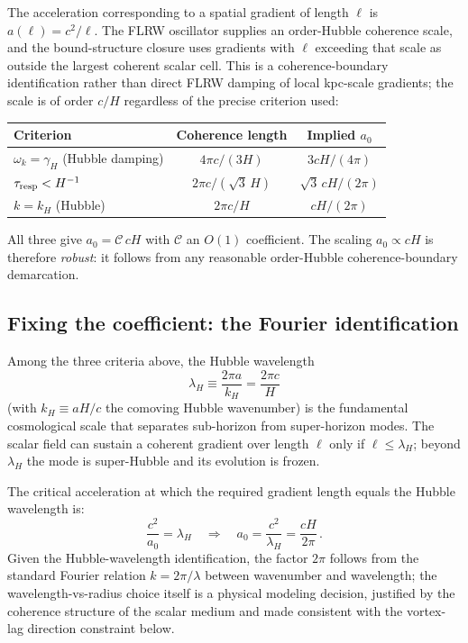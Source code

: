 \documentclass[11pt]{article}
\begin{document}
The acceleration corresponding to a spatial gradient of length $\ell$ is $a(\ell)=c^2/\ell$.  The FLRW oscillator supplies an order-Hubble coherence scale, and the bound-structure closure uses gradients with $\ell$ exceeding that scale as outside the largest coherent scalar cell.  This is a coherence-boundary identification rather than direct FLRW damping of local kpc-scale gradients; the scale is of order $c/H$ regardless of the precise criterion used:
\begin{center}
\begin{tabular}{@{}lcc@{}}
\toprule
Criterion & Coherence length & Implied $a_0$ \\
\midrule
$\omega_k=\gamma_H$ (Hubble damping) & $4\pi c/(3H)$ & $3cH/(4\pi)$ \\
$\tau_{\rm resp}< H^{-1}$ & $2\pi c/(\sqrt{3}\,H)$ & $\sqrt{3}\,cH/(2\pi)$ \\
$k=k_H$ (Hubble) & $2\pi c/H$ & $cH/(2\pi)$ \\
\bottomrule
\end{tabular}
\end{center}
All three give $a_0 = \mathcal{C}\,cH$ with $\mathcal{C}$ an $O(1)$ coefficient.  The scaling $a_0\propto cH$ is therefore \emph{robust}: it follows from any reasonable order-Hubble coherence-boundary demarcation.

\subsection{Fixing the coefficient: the Fourier identification}

Among the three criteria above, the Hubble wavelength
\begin{equation}
\lambda_H \equiv \frac{2\pi a}{k_H}=\frac{2\pi c}{H}
\label{eq:lambdaH}
\end{equation}
(with $k_H\equiv aH/c$ the comoving Hubble wavenumber) is the fundamental cosmological scale that separates sub-horizon from super-horizon modes.  The scalar field can sustain a coherent gradient over length $\ell$ only if $\ell\leq\lambda_H$; beyond $\lambda_H$ the mode is super-Hubble and its evolution is frozen.

The critical acceleration at which the required gradient length equals the Hubble wavelength is:
\begin{equation}
\frac{c^2}{a_0}=\lambda_H
\quad\Longrightarrow\quad
\boxed{a_0 = \frac{c^2}{\lambda_H}=\frac{cH}{2\pi}\,.}
\label{eq:a0}
\end{equation}
Given the Hubble-wavelength identification, the factor $2\pi$ follows from the standard Fourier relation $k=2\pi/\lambda$ between wavenumber and wavelength; the wavelength-vs-radius choice itself is a physical modeling decision, justified by the coherence structure of the scalar medium and made consistent with the vortex-lag direction constraint below.
\end{document}
